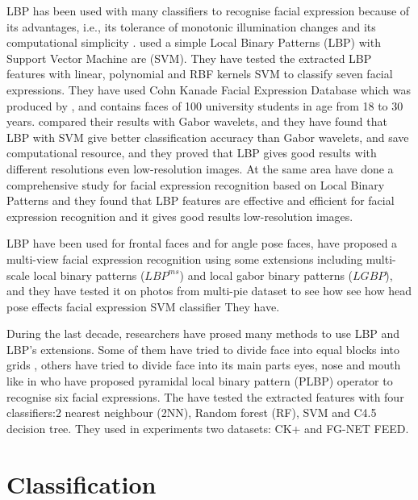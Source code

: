  LBP has been used with many classifiers to recognise facial expression because of its advantages, i.e., its tolerance of monotonic illumination changes and its computational simplicity \citep{huang2011local}. \citet{shan2005robust} used a simple Local Binary Patterns (LBP) with Support Vector Machine are (SVM). They have tested the extracted LBP features with linear, polynomial and RBF kernels SVM to classify seven facial expressions. They have used  Cohn Kanade Facial Expression Database which was produced by \citet{kanade2000comprehensive}, and contains faces of 100 university students in age from 18 to 30 years. \citet{shan2005robust} compared their results with Gabor wavelets, and they have found that LBP with SVM give better classification accuracy than Gabor wavelets, and save computational resource, and they proved that LBP gives good results with different resolutions even low-resolution images\citep{shan2005robust}. At the same area \cite{shan2009facial} have done a comprehensive study for facial expression recognition based on Local Binary Patterns and they found that LBP features are effective and efficient for facial expression recognition and it gives good results low-resolution images.
 
LBP have been used for frontal faces and for angle pose faces, \citep{moore2011local} have proposed a multi-view facial expression recognition using  some extensions including multi-scale local binary patterns ($LBP^{ms}$) and local gabor binary patterns ($LGBP$), and they have tested it on photos from multi-pie dataset \citep{gross2010multi} to see how see how head pose effects facial expression SVM classifier They have. 

During the last decade, researchers have prosed many methods to use LBP and LBP's extensions. Some of them have tried to divide face into equal blocks into grids \citep{moore2011local}, others have tried to divide face into its main parts eyes, nose and mouth like in \citet{khan2013framework} who have proposed pyramidal local binary pattern (PLBP) operator to recognise six facial expressions. The have tested the extracted features with four classifiers:2 nearest neighbour (2NN), Random forest (RF), SVM and C4.5 decision tree. They used in experiments two datasets: CK+ and FG-NET FEED.  





\section{Classification}
